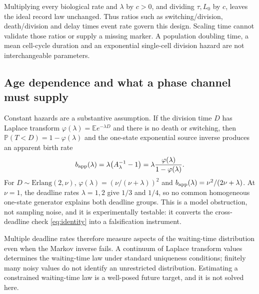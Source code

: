 \documentclass[11pt]{article}
\theoremstyle{definition}
\newcommand{\E}{\mathbb E}
\newcommand{\Prob}{\mathbb P}
\begin{document}
Multiplying every biological rate and $\lambda$ by $c>0$, and dividing
$\tau,L_0$ by $c$, leaves the ideal record law unchanged. Thus ratios such as
switching/division, death/division and delay times event rate govern this design.
Scaling time cannot validate those ratios or supply a missing marker. A
population doubling time, a mean cell-cycle duration and an exponential
single-cell division hazard are not interchangeable parameters.

\subsection{Age dependence and what a phase channel must supply}
Constant hazards are a substantive assumption. If the division time $D$ has
Laplace transform $\varphi(\lambda)=\E e^{-\lambda D}$ and there is no death or
switching, then $\Prob(T<D)=1-\varphi(\lambda)$ and the one-state exponential
source inverse produces an apparent birth rate
\begin{equation}\label{eq:age}
 b_{\rm app}(\lambda)=\lambda\bigl(A_\lambda^{-1}-1\bigr)
  =\lambda\frac{\varphi(\lambda)}{1-\varphi(\lambda)}.
\end{equation}
For $D\sim\mathrm{Erlang}(2,\nu)$, $\varphi(\lambda)=(\nu/(\nu+\lambda))^2$ and
$b_{\rm app}(\lambda)=\nu^2/(2\nu+\lambda)$. At $\nu=1$, the deadline rates
$\lambda=1,2$ give $1/3$ and $1/4$, so no common homogeneous one-state generator
explains both deadline groups. This is a model obstruction, not sampling noise,
and it is experimentally testable: it converts the cross-deadline check
\eqref{eq:identity} into a falsification instrument.

Multiple deadline rates therefore measure aspects of the waiting-time
distribution even when the Markov inverse fails. A continuum of Laplace
transform values determines the waiting-time law under standard uniqueness
conditions; finitely many noisy values do not identify an unrestricted
distribution. Estimating a constrained waiting-time law is a well-posed future
target, and it is not solved here.
\end{document}
